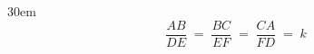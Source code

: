 \documentclass[border=4pt]{standalone}
\begin{document}
\begin{varwidth}{30em}
\large
\[ \frac{AB}{DE} \;=\; \frac{BC}{EF} \;=\; \frac{CA}{FD} \;=\; k \]

\end{varwidth}
\end{document}
